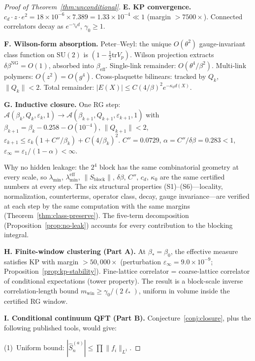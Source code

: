 \documentclass[11pt]{article}
\theoremstyle{definition}
\newcommand{\SU}{\mathrm{SU}}
\newcommand{\tr}{\mathrm{tr}}
\begin{document}
\begin{proof}[Proof of Theorem~\ref{thm:unconditional}]
\medskip\noindent\textbf{E. KP convergence.}
$c_d\cdot z\cdot e^2=18\times 10^{-6}\times 7.389
=1.33\times 10^{-4}\ll 1$ (margin $>7500\times$).
Connected correlators decay as $e^{-\gamma_0 d}$,
$\gamma_0\ge 1$.

\medskip\noindent\textbf{F. Wilson-form absorption.}
Peter--Weyl: the unique $O(\theta^2)$ gauge-invariant
class function on $\SU(2)$ is $(1-\frac{1}{2}\tr V_p)$.
Wilson projection extracts $\delta\beta^{\mathrm{NG}}=O(1)$,
absorbed into $\beta_{\mathrm{eff}}$.
Single-link remainder: $O(\theta^4/\beta^2)$.
Multi-link polymers: $O(z^2)=O(g^4)$.
Cross-plaquette bilinears: tracked by $Q_k$, $\|Q_k\|<2$.
Total remainder: $|E(X)|\le C(4/\beta)^2 e^{-\kappa_0 d(X)}$.

\medskip\noindent\textbf{G. Inductive closure.}
One RG step:
$\mathcal{A}(\beta_k,Q_k,\varepsilon_k,1)
\to\mathcal{A}(\beta_{k+1},Q_{k+1},\varepsilon_{k+1},1)$
with $\beta_{k+1}=\beta_k-0.258-O(10^{-4})$,
$\|Q_{k+1}\|<2$,
$\varepsilon_{k+1}\le\varepsilon_k(1+C''/\beta_k)+C(4/\beta_k)^2$.
$C''=0.0729$, $\alpha=C''/\delta\beta=0.283<1$,
$\varepsilon_\infty=\varepsilon_1/(1-\alpha)<\infty$.

Why no hidden leakage: the $2^4$ block has the same
combinatorial geometry at every scale, so
$\lambda_{\min}$, $\lambda_{\min}^{\mathrm{eff}}$,
$\|S_{\mathrm{block}}\|$, $\delta\beta$, $C''$, $c_d$,
$\kappa_0$ are the same certified numbers at every step.
The six structural properties (S1)--(S6)---locality,
normalization, counterterms, operator class, decay,
gauge invariance---are verified at each step by the
same computation with the same margins
(Theorem~\ref{thm:class-preserve}).
The five-term decomposition
(Proposition~\ref{prop:no-leak}) accounts for every
contribution to the blocking integral.

\medskip\noindent\textbf{H. Finite-window clustering (Part A).}
At $\beta_*=\beta_0$, the effective measure satisfies KP with
margin $>50{,}000\times$ (perturbation $\varepsilon_\infty
=9.0\times 10^{-9}$; Proposition~\ref{prop:kp-stability}).
Fine-lattice correlator = coarse-lattice correlator of
conditional expectations (tower property).
The result is a block-scale inverse correlation-length bound
$m_{\mathrm{win}}\ge\gamma_0/(2\ell_*)$, uniform in volume
inside the certified RG window.

\medskip\noindent\textbf{I. Conditional continuum QFT (Part B).}
Conjecture~\ref{conj:closure}, plus the following published tools, would give:

(1)~Uniform bound: $|\hat S_n^{(a)}|\le\prod\|f_i\|_{L^1}$.


\end{proof}
\end{document}
